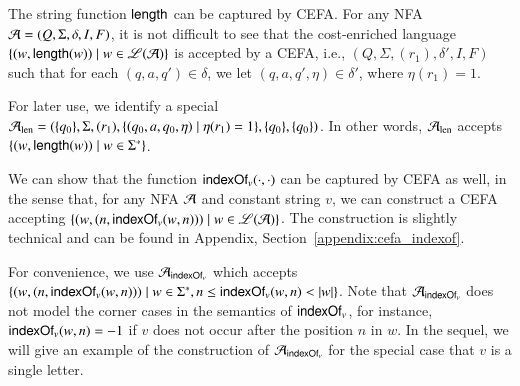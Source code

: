 \begin{example}\label{exm:len}
The string function $\mathsf{length}$ can be captured by CEFA. For any NFA $\mathcal{A}=(Q, \Sigma,  \delta, I, F)$, it is not difficult to see that the cost-enriched language $\{(w, \mathsf{length}(w)) \mid w\in \mathscr{L}(\mathcal{A})\}$ is accepted by a CEFA, i.e., 
$(Q, \Sigma, (r_1), \delta', I, F)$  %
such that for each $(q, a, q')\in \delta$, we let $(q, a, q', \eta)\in \delta'$, where $\eta(r_1) = 1$. 

For later use, we identify a special $\mathcal{A}_{\rm len}= (\{q_0\}, \Sigma, (r_1), \{(q_0, a, q_0, \eta) \mid \eta(r_1) = 1\}, \{q_0\}, \{q_0\})$. In other words, $\mathcal{A}_{\rm len}$ accepts $\{(w, \mathsf{length}(w)) \mid w\in \Sigma^*\}$.
%
%
\end{example}

We can show that the function $\mathsf{indexOf}_v(\cdot, \cdot)$ can be captured by CEFA as well, in the sense that, for any NFA $\mathcal{A}$ and constant string $v$, we can construct a CEFA %
accepting $\{(w, (n, \mathsf{indexOf}_v(w, n)))\mid w\in \mathscr{L}(\mathcal{A}) \}$. %
The construction is slightly technical and can be found in Appendix, Section~\ref{appendix:cefa_indexof}.

For convenience, we use $\mathcal{A}_{\mathsf{indexOf}_v}$ which accepts $\{(w, (n, \mathsf{indexOf}_v(w, n)))\mid w\in \Sigma^*, n \le \mathsf{indexOf}_v(w, n) < |w| \}$. %
Note that $\mathcal{A}_{\mathsf{indexOf}_v}$ does not model the corner cases in the semantics of $\mathsf{indexOf}_v$, for instance, $\mathsf{indexOf}_v(w, n) = -1$ if $v$ does not occur after the position $n$ in $w$.
In the sequel, we will give an example of the construction of $\mathcal{A}_{\mathsf{indexOf}_v}$ for the special case that $v$ is a single letter.  

